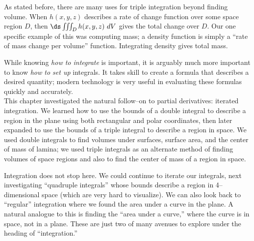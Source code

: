 As stated before, there are many uses for triple integration beyond finding volume. When $h(x,y,z)$ describes a rate of change function over some space region $D$, then $\ds \iiint_D h(x,y,z)\ dV$ gives the total change over $D$. Our one specific example of this was computing mass; a density function is simply a ``rate of mass change per volume'' function. Integrating density gives total mass.

While knowing \textit{how to integrate}  is important, it is arguably much more important to know \textit{how to set up} integrals. It takes skill to create a formula that describes a desired quantity; modern technology is very useful in evaluating these formulas quickly and accurately.\\

This chapter investigated the natural follow--on to partial derivatives: iterated integration. We learned how to use the bounds of a double integral to describe a region in the plane using both rectangular and polar coordinates, then later expanded to use the bounds of a triple integral to describe a region in space. We used double integrals to find volumes under surfaces, surface area, and the center of mass of lamina; we used triple integrals as an alternate method of finding volumes of space regions and also to find the center of mass of a region in space.

Integration does not stop here. We could continue to iterate our integrals, next investigating ``quadruple integrals'' whose bounds describe a region in 4--dimensional space (which are very hard to visualize). We can also look back to ``regular'' integration where we found the area under a curve in the plane. A natural analogue to this is finding the ``area under a curve,'' where the curve is in space, not in a plane. These are just two of many avenues to explore under the heading of ``integration.'' 

